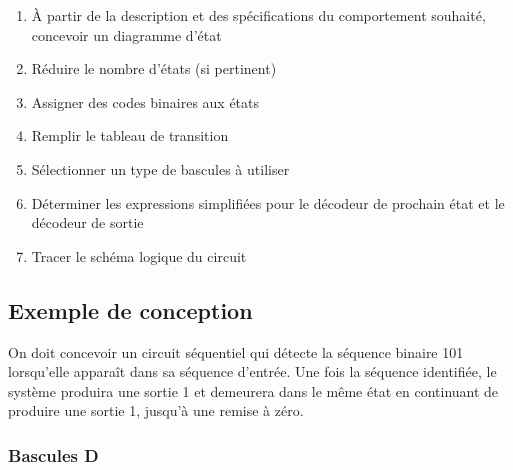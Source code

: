 \documentclass[11pt]{article}
\begin{document}
\begin{enumerate}
\item À partir de la description et des spécifications du comportement
souhaité, concevoir un diagramme d'état
\item Réduire le nombre d'états (si pertinent)
\item Assigner des codes binaires aux états
\item Remplir le tableau de transition
\item Sélectionner un type de bascules à utiliser
\item Déterminer les expressions simplifiées pour le décodeur de prochain
état et le décodeur de sortie
\item Tracer le schéma logique du circuit
\end{enumerate}

\subsection{Exemple de conception}
\label{sec:org87d7229}

On doit concevoir un circuit séquentiel qui détecte la séquence
binaire 101 lorsqu'elle apparaît dans sa séquence d'entrée. Une fois
la séquence identifiée, le système produira une sortie 1 et demeurera
dans le même état en continuant de produire une sortie 1, jusqu'à une
remise à zéro.

\subsubsection{Bascules D}
\label{sec:org0b99b6e}
\end{document}
